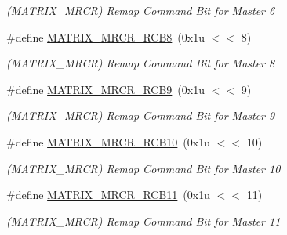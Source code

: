 \begin{DoxyCompactItemize}
\begin{DoxyCompactList}\small\item\em (M\+A\+T\+R\+I\+X\+\_\+\+M\+R\+CR) Remap Command Bit for Master 6 \end{DoxyCompactList}\item 
\mbox{\label{group__SAME70__MATRIX_gad0bf8066b69cd6cd777ff6b5117ef108}} 
\#define \mbox{\hyperlink{group__SAME70__MATRIX_gad0bf8066b69cd6cd777ff6b5117ef108}{M\+A\+T\+R\+I\+X\+\_\+\+M\+R\+C\+R\+\_\+\+R\+C\+B8}}~(0x1u $<$$<$ 8)
\begin{DoxyCompactList}\small\item\em (M\+A\+T\+R\+I\+X\+\_\+\+M\+R\+CR) Remap Command Bit for Master 8 \end{DoxyCompactList}\item 
\mbox{\label{group__SAME70__MATRIX_gafecaedb9f83bf43cadbcd24baa58ff43}} 
\#define \mbox{\hyperlink{group__SAME70__MATRIX_gafecaedb9f83bf43cadbcd24baa58ff43}{M\+A\+T\+R\+I\+X\+\_\+\+M\+R\+C\+R\+\_\+\+R\+C\+B9}}~(0x1u $<$$<$ 9)
\begin{DoxyCompactList}\small\item\em (M\+A\+T\+R\+I\+X\+\_\+\+M\+R\+CR) Remap Command Bit for Master 9 \end{DoxyCompactList}\item 
\mbox{\label{group__SAME70__MATRIX_gad782e22030a3133cb0d6a3030664bf0f}} 
\#define \mbox{\hyperlink{group__SAME70__MATRIX_gad782e22030a3133cb0d6a3030664bf0f}{M\+A\+T\+R\+I\+X\+\_\+\+M\+R\+C\+R\+\_\+\+R\+C\+B10}}~(0x1u $<$$<$ 10)
\begin{DoxyCompactList}\small\item\em (M\+A\+T\+R\+I\+X\+\_\+\+M\+R\+CR) Remap Command Bit for Master 10 \end{DoxyCompactList}\item 
\mbox{\label{group__SAME70__MATRIX_ga1cbcbb862ecff9a039a885ad9a80b732}} 
\#define \mbox{\hyperlink{group__SAME70__MATRIX_ga1cbcbb862ecff9a039a885ad9a80b732}{M\+A\+T\+R\+I\+X\+\_\+\+M\+R\+C\+R\+\_\+\+R\+C\+B11}}~(0x1u $<$$<$ 11)
\begin{DoxyCompactList}\small\item\em (M\+A\+T\+R\+I\+X\+\_\+\+M\+R\+CR) Remap Command Bit for Master 11 \end{DoxyCompactList}\item 

\end{DoxyCompactItemize}
